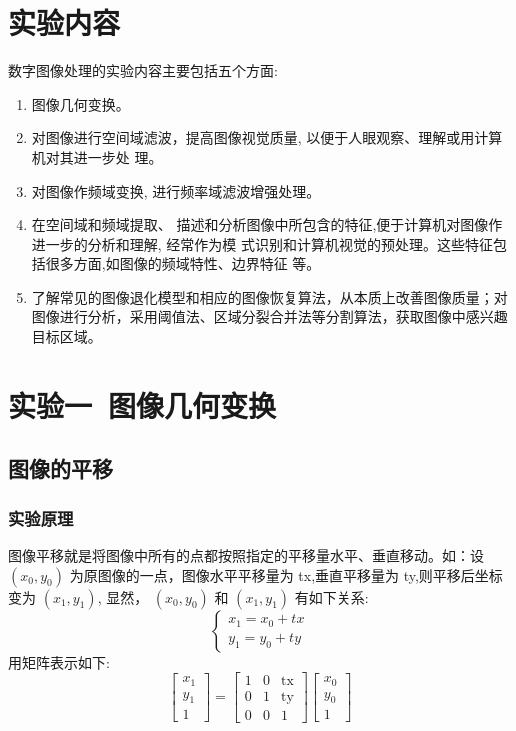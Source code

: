 \documentclass{ctexart}
\begin{document}
\section{\hei 实验内容}
数字图像处理的实验内容主要包括五个方面:
\begin{enumerate}
    \item 图像几何变换。
    \item 对图像进行空间域滤波，提高图像视觉质量, 以便于人眼观察、理解或用计算机对其进一步处
          理。
    \item 对图像作频域变换, 进行频率域滤波增强处理。
    \item 在空间域和频域提取、
          描述和分析图像中所包含的特征,便于计算机对图像作进一步的分析和理解, 经常作为模
          式识别和计算机视觉的预处理。这些特征包括很多方面,如图像的频域特性、边界特征
          等。
    \item 了解常见的图像退化模型和相应的图像恢复算法，从本质上改善图像质量；对
          图像进行分析，采用阈值法、区域分裂合并法等分割算法，获取图像中感兴趣目标区域。
\end{enumerate}
\section{\hei 实验一\ 图像几何变换}
\subsection{\hei 图像的平移}
\subsubsection{\hei 实验原理}
图像平移就是将图像中所有的点都按照指定的平移量水平、垂直移动。如：设 $\left(x_{0}, y_{0}\right)$ 为原图像的一点，图像水平平移量为 tx,垂直平移量为 ty,则平移后坐标变为
$\left(x_{1}, y_{1}\right)$, 显然， $\left(x_{0}, y_{0}\right)$ 和 $\left(x_{1}, y_{1}\right)$ 有如下关系:
$$\left\{\begin{array}{l}x_{1}=x_{0}+t x \\ y_{1}=y_{0}+t y\end{array}\right.$$
用矩阵表示如下:
$$\left[\begin{array}{l}x_{1} \\ y_{1} \\ 1\end{array}\right]=\left[\begin{array}{lll}1 & 0 & \mathrm{tx} \\ 0 & 1 & \mathrm{ty} \\ 0 & 0 & 1\end{array}\right]\left[\begin{array}{l}x_{0} \\ y_{0} \\ 1\end{array}\right]$$
\end{document}
